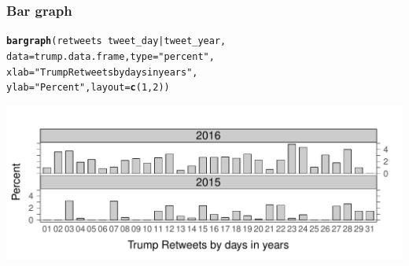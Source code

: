 \documentclass{beamer}\usepackage[]{graphicx}\usepackage[]{color}
\makeatletter
\newcommand{\hlnum}[1]{\textcolor[rgb]{0.2,0.2,0.2}{#1}}%
\newcommand{\hlstr}[1]{\textcolor[rgb]{0.2,0.2,0.2}{#1}}%
\newcommand{\hlopt}[1]{\textcolor[rgb]{0.102,0.102,0.102}{#1}}%
\newcommand{\hlstd}[1]{\textcolor[rgb]{0.102,0.102,0.102}{#1}}%
\newcommand{\hlkwc}[1]{\textcolor[rgb]{0.2,0.2,0.2}{#1}}%
\newcommand{\hlkwd}[1]{\textcolor[rgb]{0.102,0.102,0.102}{\textbf{#1}}}%
\newenvironment{kframe}{%
 \def\at@end@of@kframe{}%
 \ifinner\ifhmode%
  \def\at@end@of@kframe{\end{minipage}}%
  \begin{minipage}{\columnwidth}%
 \fi\fi%
 \def\FrameCommand##1{\hskip\@totalleftmargin \hskip-\fboxsep
 \colorbox{shadecolor}{##1}\hskip-\fboxsep
     \hskip-\linewidth \hskip-\@totalleftmargin \hskip\columnwidth}%
 \MakeFramed {\advance\hsize-\width
   \@totalleftmargin\z@ \linewidth\hsize
   \@setminipage}}%
 {\par\unskip\endMakeFramed%
 \at@end@of@kframe}
\newenvironment{knitrout}{}{} %
\renewenvironment{knitrout}{\begin{spacing}{0.75}\begin{tiny}}{\end{tiny}\end{spacing}}
\makeatother
\begin{document}
\begin{frame}[fragile]
\frametitle{Bar graph}

\begin{knitrout}\small
{}\color{fgcolor}\begin{kframe}
\begin{alltt}
\hlkwd{bargraph}\hlstd{(retweets}\hlopt{~} \hlstd{tweet_day} \hlopt{|} \hlstd{tweet_year,}
         \hlkwc{data}\hlstd{=trump.data.frame,} \hlkwc{type}\hlstd{=}\hlstr{"percent"}\hlstd{,}
         \hlkwc{xlab}\hlstd{=}\hlstr{"Trump Retweets by days in years"}\hlstd{,}
         \hlkwc{ylab}\hlstd{=}\hlstr{"Percent"}\hlstd{,} \hlkwc{layout}\hlstd{=}\hlkwd{c}\hlstd{(}\hlnum{1}\hlstd{,}\hlnum{2}\hlstd{))}
\end{alltt}
\end{kframe}

{\centering \includegraphics[width=0.99\linewidth]{figure/graphics-bar_retweets_3-1} 

}



\end{knitrout}

\end{frame}
\end{document}
